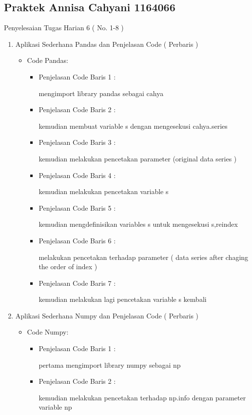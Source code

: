 \subsection{Praktek Annisa Cahyani 1164066 }
Penyelesaian Tugas Harian 6 ( No. 1-8 )
\begin{enumerate}
\item Aplikasi Sederhana Pandas dan Penjelasan Code ( Perbaris )
\begin{itemize}
\item Code Pandas:
\par 
\par
\begin{itemize}
\item Penjelasan Code Baris 1 : 
\par mengimport library pandas sebagai cahya 
\item Penjelasan Code Baris 2 :
\par kemudian membuat variable s dengan mengesekusi cahya.series
\item Penjelasan Code Baris 3 :
\par kemudian melakukan pencetakan parameter (original data series )
\item Penjelasan Code Baris 4 :
\par kemudian melakukan pencetakan variable s
\item Penjelasan Code Baris 5 :
\par kemudian mengdefinisikan variables s untuk mengesekusi s,reindex 
\item Penjelasan Code Baris 6 :
\par melakukan pencetakan terhadap parameter ( data series after chaging the order of index )
\item Penjelasan Code Baris 7 :
\par kemudian melakukan lagi pencetakan variable s kembali
\end{itemize}
\end{itemize}


\par
\par
\item Aplikasi Sederhana Numpy dan Penjelasan Code ( Perbaris )
\begin{itemize}
\item Code Numpy:
\par
\begin{itemize}
\item Penjelasan Code Baris 1 :
\par pertama mengimport library numpy sebagai np 
\item Penjelasan Code Baris 2 :
\par kemudian melakukan pencetakan terhadap np.info dengan parameter variable np
\end{itemize}
\end{itemize}


\end{enumerate}
